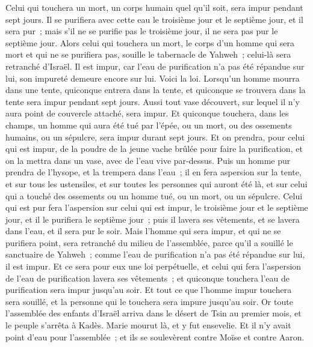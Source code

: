 \begin{multicols}{2}
Celui qui touchera un mort, un corps humain quel qu'il soit, sera impur pendant sept jours.
Il se purifiera avec cette eau le troisième jour et le septième jour, et il sera pur~; mais s'il ne se purifie pas le troisième jour, il ne sera pas pur le septième jour.
Alors celui qui touchera un mort, le corps d'un homme qui sera mort et qui ne se purifiera pas, souille le tabernacle de Yahweh~; celui-là sera retranché d'Israël. Il est impur, car l'eau de purification n'a pas été répandue sur lui, son impureté demeure encore sur lui.
Voici la loi. Lorsqu'un homme mourra dans une tente, quiconque entrera dans la tente, et quiconque se trouvera dans la tente sera impur pendant sept jours.
Aussi tout vase découvert, sur lequel il n'y aura point de couvercle attaché, sera impur.
Et quiconque touchera, dans les champs, un homme qui aura été tué par l'épée, ou un mort, ou des ossements humains, ou un sépulcre, sera impur durant sept jours.
Et on prendra, pour celui qui est impur, de la poudre de la jeune vache brûlée pour faire la purification, et on la mettra dans un vase, avec de l'eau vive par-dessus.
Puis un homme pur prendra de l'hysope, et la trempera dans l'eau~; il en fera aspersion sur la tente, et sur tous les ustensiles, et sur toutes les personnes qui auront été là, et sur celui qui a touché des ossements ou un homme tué, ou un mort, ou un sépulcre.
Celui qui est pur fera l'aspersion sur celui qui est impur, le troisième jour et le septième jour, et il le purifiera le septième jour~; puis il lavera ses vêtements, et se lavera dans l'eau, et il sera pur le soir.
Mais l'homme qui sera impur, et qui ne se purifiera point, sera retranché du milieu de l'assemblée, parce qu'il a souillé le sanctuaire de Yahweh~; comme l'eau de purification n'a pas été répandue sur lui, il est impur.
Et ce sera pour eux une loi perpétuelle, et celui qui fera l'aspersion de l'eau de purification lavera ses vêtements~; et quiconque touchera l'eau de purification sera impur jusqu'au soir.
Et tout ce que l'homme impur touchera sera souillé, et la personne qui le touchera sera impure jusqu'au soir.
\VerseOne{}Or toute l'assemblée des enfants d'Israël arriva dans le désert de Tsin au premier mois, et le peuple s'arrêta à Kadès. Marie mourut là, et y fut ensevelie.
Et il n'y avait point d'eau pour l'assemblée~; et ils se soulevèrent contre Moïse et contre Aaron.

\end{multicols}
